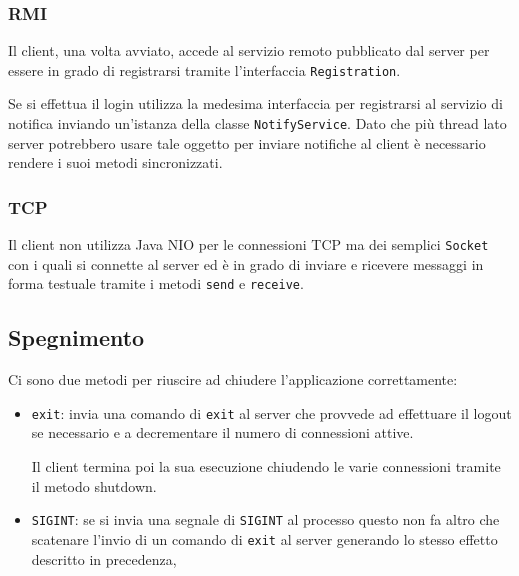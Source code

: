 \subsubsection{RMI}
Il client, una volta avviato, accede al servizio remoto pubblicato dal server per essere in grado
di registrarsi tramite l'interfaccia \verb|Registration|.

Se si effettua il login utilizza la medesima interfaccia per registrarsi al servizio di notifica
inviando un'istanza della classe \verb|NotifyService|. Dato che più thread lato server potrebbero
usare tale oggetto per inviare notifiche al client è necessario rendere i suoi metodi
sincronizzati.

\subsubsection{TCP}
Il client non utilizza Java NIO per le connessioni TCP ma dei semplici \verb|Socket| con i quali
si connette al server ed è in grado di inviare e ricevere messaggi in forma testuale tramite i
metodi \verb|send| e \verb|receive|.

\subsection{Spegnimento}
Ci sono due metodi per riuscire ad chiudere l'applicazione correttamente:
\begin{itemize}
	\item \verb|exit|: invia una comando di \verb|exit| al server che provvede ad effettuare il
	      logout se necessario e a decrementare il numero di connessioni attive.

	      Il client termina poi la sua esecuzione chiudendo le varie connessioni tramite il metodo
	      shutdown.
	\item \verb|SIGINT|: se si invia una segnale di \verb|SIGINT| al processo questo non fa altro
	      che scatenare l'invio di un comando di \verb|exit| al server generando lo stesso effetto
	      descritto in precedenza,
\end{itemize}
